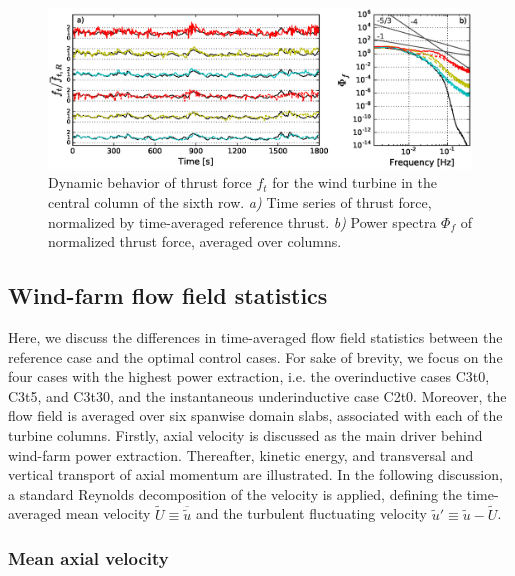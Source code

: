 \begin{figure}
	\includegraphics[width=\textwidth]{chapters/philtrans_torque/thrust_forces.eps}
	\caption{Dynamic behavior of thrust force $f_t$ for the wind turbine in the central column of the sixth row. \emph{a)} Time series of thrust force, normalized by time-averaged reference thrust. \emph{b) } Power spectra $\Phi_f$ of normalized thrust force, averaged over columns. \legend \label{fig:thrust}}
\end{figure}




\subsection{Wind-farm flow field statistics}\label{sec:opt_ind_flow}

	Here, we discuss the differences in time-averaged flow field statistics between the reference case and the optimal control cases. For sake of brevity, we focus on the four cases with the highest power extraction, i.e. the overinductive cases C3t0, C3t5, and C3t30, and the instantaneous underinductive case C2t0. Moreover, the flow field is averaged over six spanwise domain slabs, associated with each of the turbine columns. Firstly, axial velocity is discussed as the main driver behind wind-farm power extraction. Thereafter, kinetic energy, and transversal and vertical transport of axial momentum are illustrated. In the following discussion, a standard Reynolds decomposition of the velocity is applied, defining the time-averaged mean velocity $\widetilde{U} \equiv \overline{\widetilde{u}}$ and the turbulent fluctuating velocity $\widetilde{u}' \equiv  \widetilde{u} - \widetilde{U}$.

	\subsubsection{Mean axial velocity}


